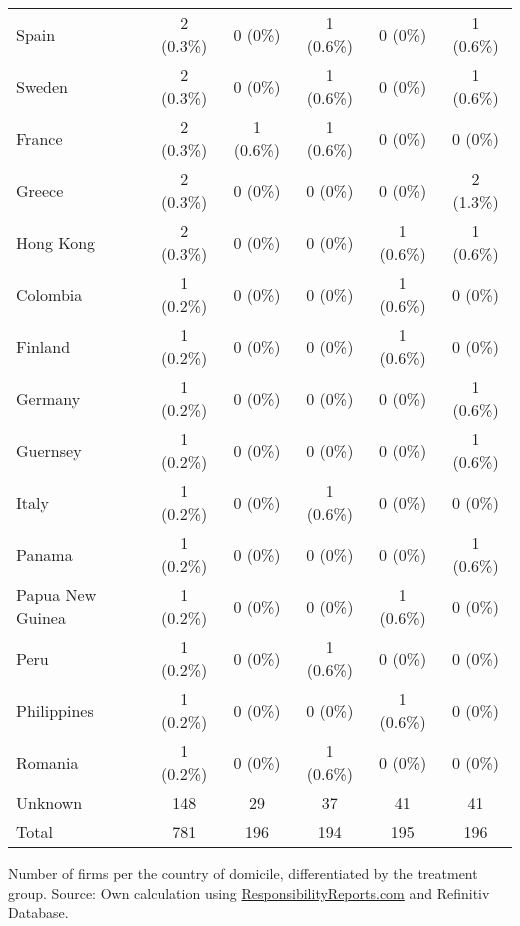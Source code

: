 \documentclass[12pt]{article}
\begin{document}
\begin{table}
{\begin{tabular}{lccccc}
    Spain & 2 (0.3\%) & 0 (0\%) & 1 (0.6\%) & 0 (0\%) & 1 (0.6\%)\\
    Sweden & 2 (0.3\%) & 0 (0\%) & 1 (0.6\%) & 0 (0\%) & 1 (0.6\%)\\
    France & 2 (0.3\%) & 1 (0.6\%) & 1 (0.6\%) & 0 (0\%) & 0 (0\%)\\
    Greece & 2 (0.3\%) & 0 (0\%) & 0 (0\%) & 0 (0\%) & 2 (1.3\%)\\
    Hong Kong & 2 (0.3\%) & 0 (0\%) & 0 (0\%) & 1 (0.6\%) & 1 (0.6\%)\\
    Colombia & 1 (0.2\%) & 0 (0\%) & 0 (0\%) & 1 (0.6\%) & 0 (0\%)\\
    Finland & 1 (0.2\%) & 0 (0\%) & 0 (0\%) & 1 (0.6\%) & 0 (0\%)\\
    Germany & 1 (0.2\%) & 0 (0\%) & 0 (0\%) & 0 (0\%) & 1 (0.6\%)\\
    Guernsey & 1 (0.2\%) & 0 (0\%) & 0 (0\%) & 0 (0\%) & 1 (0.6\%)\\
    Italy & 1 (0.2\%) & 0 (0\%) & 1 (0.6\%) & 0 (0\%) & 0 (0\%)\\
    Panama & 1 (0.2\%) & 0 (0\%) & 0 (0\%) & 0 (0\%) & 1 (0.6\%)\\
    Papua New Guinea & 1 (0.2\%) & 0 (0\%) & 0 (0\%) & 1 (0.6\%) & 0 (0\%)\\
    Peru & 1 (0.2\%) & 0 (0\%) & 1 (0.6\%) & 0 (0\%) & 0 (0\%)\\
    Philippines & 1 (0.2\%) & 0 (0\%) & 0 (0\%) & 1 (0.6\%) & 0 (0\%)\\
    Romania & 1 (0.2\%) & 0 (0\%) & 1 (0.6\%) & 0 (0\%) & 0 (0\%)\\
    Unknown & 148 & 29 & 37 & 41 & 41\\
    \midrule
    Total & 781 & 196 &  194 & 195 & 196\\
    \bottomrule
    \end{tabular}

    \vspace{0.2cm}
    
    \begin{tablenotes}
        \footnotesize
        \item Number of firms per the country of domicile, differentiated by the treatment group. Source: Own calculation using \href{https://responsibilityreports.com}{ResponsibilityReports.com} and Refinitiv Database.
    \end{tablenotes}
    
    
    }
\end{table}

\end{document}
